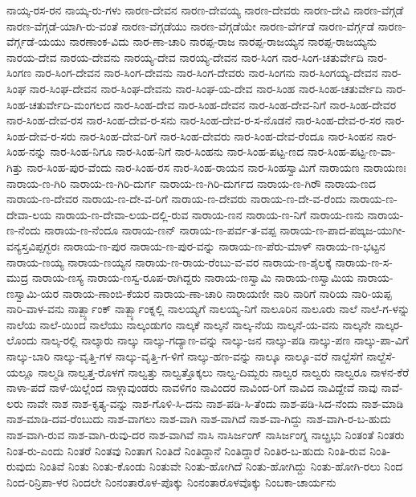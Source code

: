 ನಾಯ್ಕ-ರಸ-ರನ
ನಾಯ್ಕ-ರು-ಗಳು
ನಾರಣ-ದೇವನ
ನಾರಣ-ದೇವಯ್ಯ
ನಾರಣ-ದೇವರು
ನಾರಣ-ದೇವಿ
ನಾರಣ-ವೆಗ್ಗಡೆ
ನಾರಣ-ವೆಗ್ಗಡೆ-ಯಾಗಿ-ರು-ವಂತೆ
ನಾರಣ-ವೆಗ್ಗಡೆಯು
ನಾರಣ-ವೆಗ್ಗಡೆಯೇ
ನಾರಣ-ವೆರ್ಗಡೆ
ನಾರಣ-ವೆರ್ಗ್ಗಡೆ
ನಾರಣ-ವೆರ್ಗ್ಗಡೆ-ಯಯು
ನಾರಣಾಂಕ-ವಿದು
ನಾರ-ಣಾ-ಚಾರಿ
ನಾರಪ್ಪ-ರಾಜ
ನಾರಪ್ಪ-ರಾಜಯ್ಯನ
ನಾರಪ್ಪ-ರಾಜಯ್ಯನು
ನಾರಯ-ದೇವ
ನಾರಯ-ದೇವನು
ನಾರಯ್ಯ-ದೇವ
ನಾರಯ್ಯ-ದೇವನ
ನಾರ-ಸಿಂಗ
ನಾರ-ಸಿಂಗ-ಚತುರ್ವೇದಿ
ನಾರ-ಸಿಂಗಣ
ನಾರ-ಸಿಂಗ-ದೇವನ
ನಾರ-ಸಿಂಗ-ದೇವನು
ನಾರ-ಸಿಂಗ-ದೇವರು
ನಾರ-ಸಿಂಗನು
ನಾರ-ಸಿಂಗಯ್ಯ-ದೇವನ
ನಾರ-ಸಿಂಘ
ನಾರ-ಸಿಂಘ-ದೇವನ
ನಾರ-ಸಿಂಘ-ದೇವನು
ನಾರ-ಸಿಂಘ-ಯ-ದೇವ
ನಾರ-ಸಿಂಹ
ನಾರ-ಸಿಂಹ-ಚತುರ್ವೇದಿ
ನಾರ-ಸಿಂಹ-ಚತುರ್ವೇದಿ-ಮಂಗಲದ
ನಾರ-ಸಿಂಹ-ದೇವ
ನಾರ-ಸಿಂಹ-ದೇವನ
ನಾರ-ಸಿಂಹ-ದೇವ-ನಿಗೆ
ನಾರ-ಸಿಂಹ-ದೇವರ
ನಾರ-ಸಿಂಹ-ದೇವ-ರಸ
ನಾರ-ಸಿಂಹ-ದೇವ-ರ-ಸನು
ನಾರ-ಸಿಂಹ-ದೇವ-ರ-ಸ-ನೊಡನೆ
ನಾರ-ಸಿಂಹ-ದೇವ-ರ-ಸರ
ನಾರ-ಸಿಂಹ-ದೇವ-ರ-ಸರು
ನಾರ-ಸಿಂಹ-ದೇವ-ರಿಗೆ
ನಾರ-ಸಿಂಹ-ದೇವರು
ನಾರ-ಸಿಂಹ-ದೇವ-ರೆಂದೂ
ನಾರ-ಸಿಂಹನ
ನಾರ-ಸಿಂಹ-ನನ್ನು
ನಾರ-ಸಿಂಹ-ನಿಗೂ
ನಾರ-ಸಿಂಹ-ನಿಗೆ
ನಾರ-ಸಿಂಹನು
ನಾರ-ಸಿಂಹ-ಪಟ್ಟ-ಣದ
ನಾರ-ಸಿಂಹ-ಪಟ್ಟ-ಣ-ವಾ-ಗಿತ್ತು
ನಾರ-ಸಿಂಹ-ಪುರ-ವೆಂದು
ನಾರ-ಸಿಂಹ-ರಸ
ನಾರ-ಸಿಂಹ-ರಾಯನ
ನಾರ-ಸಿಂಹಸ್ವಾಮಿಗೆ
ನಾರಾಯಣ
ನಾರಾಯಣಃ
ನಾರಾಯ-ಣ-ಗಿರಿ
ನಾರಾಯ-ಣ-ಗಿರಿ-ದುರ್ಗ
ನಾರಾಯ-ಣ-ಗಿರಿ-ದುರ್ಗದ
ನಾರಾಯ-ಣ-ಗಿರೌ
ನಾರಾಯ-ಣದ
ನಾರಾಯ-ಣ-ದೇವರ
ನಾರಾಯ-ಣ-ದೇ-ವ-ರಿಗೆ
ನಾರಾಯ-ಣ-ದೇವರು
ನಾರಾಯ-ಣ-ದೇ-ವ-ರೆಂದು
ನಾರಾಯ-ಣ-ದೇವಾ-ಲಯ
ನಾರಾಯ-ಣ-ದೇವಾ-ಲಯ-ದಲ್ಲಿ-ರುವ
ನಾರಾಯ-ಣನ
ನಾರಾಯ-ಣ-ನಿಗೆ
ನಾರಾಯ-ಣನು
ನಾರಾಯ-ಣ-ನೆಂದು
ನಾರಾಯ-ಣ-ನೆಂದೂ
ನಾರಾಯ-ಣನ್
ನಾರಾಯ-ಣ-ಪರ್ವ-ತ-ವಪ್ಪ
ನಾರಾಯ-ಣ-ಪಾದ-ಪಙ್ಕಜ-ಯುಗೀ-ವನ್ಯಸ್ತವಿಪ್ಪಗ್ಭರಃ
ನಾರಾಯ-ಣ-ಪುರ
ನಾರಾಯ-ಣ-ಪುರ-ವನ್ನು
ನಾರಾಯ-ಣ-ಪೆರು-ಮಾಳ್
ನಾರಾಯ-ಣ-ಭಟ್ಟನ
ನಾರಾಯ-ಣಯ್ಯ
ನಾರಾಯ-ಣಯ್ಯನ
ನಾರಾಯ-ಣ-ರಾಯ-ರೆಂಬು-ವ-ವರ
ನಾರಾಯ-ಣ-ಶೈಲಕ್ಕೆ
ನಾರಾಯ-ಣ-ಸ-ಮುದ್ರ
ನಾರಾಯ-ಣಸ್ಯ
ನಾರಾಯ-ಣಸ್ವ-ರೂಪ-ರಾಗಿದ್ದರು
ನಾರಾಯ-ಣಸ್ವಾಮಿ
ನಾರಾಯ-ಣಸ್ವಾಮಿಯ
ನಾರಾಯ-ಣಸ್ವಾಮಿ-ಯರ
ನಾರಾಯ-ಣಾಂಬಿ-ಕೆಯರ
ನಾರಾಯ-ಣಾ-ಚಾರಿ
ನಾರಾಯಣೀ
ನಾರಿ
ನಾರಿಗೆ
ನಾರಿಯ
ನಾರಿ-ಯಪ್ಪ
ನಾರಿ-ವಾಳ-ವನು
ನಾರ್ತ್ಬ್ಯಾಂಕ್
ನಾರ್ತ್ಬ್ಯಾಂಕ್ನಲ್ಲಿ
ನಾಲಯ್ಯಗೆ
ನಾಲಯ್ಯ-ನಿಗೆ
ನಾಲೂರಿನ
ನಾಲೂರು
ನಾಲೆ
ನಾಲೆ-ಗ-ಳನ್ನು
ನಾಲೆಯ
ನಾಲೆ-ಯಿಂದ
ನಾಲೆಯು
ನಾಲ್ಕಂಡುಗಂ
ನಾಲ್ಕಕೆ
ನಾಲ್ಕನೆ
ನಾಲ್ಕ-ನೆಯ
ನಾಲ್ಕನೆ-ಯ-ವನು
ನಾಲ್ಕನೇ
ನಾಲ್ಕರ-ಲೊಂದು
ನಾಲ್ಕ-ರಲ್ಲಿ
ನಾಲ್ಕಾರು
ನಾಲ್ಕು
ನಾಲ್ಕು-ಗದ್ಯಾಣ-ವನ್ನು
ನಾಲ್ಕು-ಜನ
ನಾಲ್ಕು-ಪಡಿ
ನಾಲ್ಕು-ಪಣ
ನಾಲ್ಕು-ಪಾ-ವಿಗೆ
ನಾಲ್ಕು-ಬಾರಿ
ನಾಲ್ಕು-ವೃತ್ತಿ-ಗಳ
ನಾಲ್ಕು-ವೃತ್ತಿ-ಗ-ಳಿಗೆ
ನಾಲ್ಕು-ಹಣ-ವನ್ನು
ನಾಲ್ಕೂ
ನಾಲ್ಕೂ-ವರೆ
ನಾಲ್ದೆಸೆಗೆ
ನಾಲ್ದೆಸೆ-ಯಲ್ಲೂ
ನಾಲ್ಮಡಿ
ನಾಲ್ವತ್ತ-ರೊಳಗೆ
ನಾಲ್ವತ್ತು
ನಾಲ್ವತ್ತೊಕ್ಕಲು
ನಾಲ್ವ-ದಿಮ್ಬರು
ನಾಲ್ವರ
ನಾಲ್ವರು
ನಾಲ್ವರೂ
ನಾಳನ-ಕೆರೆ
ನಾಳಾ-ಪದೆ
ನಾಳೆ-ಯಿಲ್ಲೆಂದ
ನಾಳ್ಗಾವುಂಡರು
ನಾವಳಿಗಂ
ನಾವಿಂದರ
ನಾವಿಂದ-ರಿಗೆ
ನಾವಿದ
ನಾವಿದ್ದೇವೆ
ನಾವು
ನಾವೆ-ಲರು
ನಾವೇ
ನಾಶ
ನಾಶ-ಕೃತ್ಯ-ವನ್ನು
ನಾಶ-ಗೊಳಿ-ಸಿ-ದನು
ನಾಶ-ಪಡಿ-ಸಿ-ತೆಂದು
ನಾಶ-ಪಡಿ-ಸಿದ-ನೆಂದು
ನಾಶ-ಮಾಡಿ
ನಾಶ-ಮಾಡಿ-ದವ-ರೆಂಬುದು
ನಾಶ-ವಾಗಲು
ನಾಶ-ವಾಗಿ
ನಾಶ-ವಾಗಿದೆ
ನಾಶ-ವಾ-ಗಿದ್ದು
ನಾಶ-ವಾಗಿ-ರ-ಬ-ಹುದು
ನಾಶ-ವಾಗಿ-ರುವ
ನಾಶ-ವಾಗಿ-ರುವು-ದರ
ನಾಶ-ವಾಗಿವೆ
ನಾಸಿ
ನಾಸಿರ್ಜಂಗ್
ನಾಸಿರ್ಜಂಗ್ನ
ನಾೞ್ಪ್ರಭು
ನಿಂತಂತೆ
ನಿಂತರು
ನಿಂತ-ರು-ಎಂದು
ನಿಂತರೆ
ನಿಂತವು
ನಿಂತಾಗ
ನಿಂತಿದೆ
ನಿಂತಿದ್ದಾನೆ
ನಿಂತಿದ್ದಾರೆ
ನಿಂತಿರ-ಬ-ಹುದು
ನಿಂತಿ-ರುವ
ನಿಂತಿ-ರುವುದು
ನಿಂತಿವೆ
ನಿಂತು
ನಿಂತು-ಕೊಂಡು
ನಿಂತುವೇ
ನಿಂತು-ಹೋಗಿದೆ
ನಿಂತು-ಹೋಗಿದ್ದು
ನಿಂತು-ಹೋಗಿ-ರಲು
ನಿಂದ
ನಿಂದ-ರಿನ್ರಿಪಾ-ಳರ
ನಿಂದಲೇ
ನಿಂನಂತಾರೊಳ-ಪೊಕ್ಕು
ನಿಂನಂತಾರೊಳವೊಕ್ಕು
ನಿಂಬಕಾ-ಚಾರ್ಯನು
